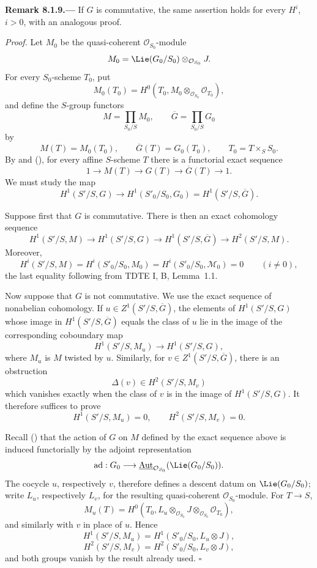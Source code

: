 \par\medskip\noindent{}\textbf{Remark 8.1.9.---}\enspace
If \(G\) is commutative, the same assertion holds for every
\(H^i\), \(i>0\), with an analogous proof.

\smallskip\noindent\emph{Proof.}
Let \(M_0\) be the quasi-coherent \(\mathcal O_{S_0}\)-module
\[
  M_0
  =
  \Lie(G_0/S_0)\otimes_{\mathcal O_{S_0}}J.
\]
For every \(S_0\)-scheme \(T_0\), put
\[
  M_0(T_0)
  =
  H^0\!\left(
    T_0,
    M_0\otimes_{\mathcal O_{S_0}}\mathcal O_{T_0}
  \right),
\]
and define the \(S\)-group functors
\[
  M=\prod_{S_0/S}M_0,
  \qquad
  \overline G=\prod_{S_0/S}G_0
\]
by
\[
  M(T)=M_0(T_0),
  \qquad
  \overline G(T)=G_0(T_0),
  \qquad
  T_0=T\times_SS_0.
\]
By  and (), for every affine \(S\)-scheme \(T\)
there is a functorial exact sequence
\[
  1\longrightarrow M(T)\longrightarrow G(T)
  \longrightarrow\overline G(T)\longrightarrow1.
\]
We must study the map
\[
  H^1(S'/S,G)
  \longrightarrow
  H^1(S'_0/S_0,G_0)
  =
  H^1(S'/S,\overline G).
\]

Suppose first that \(G\) is commutative. There is then an exact
cohomology sequence
\[
  H^1(S'/S,M)
  \longrightarrow H^1(S'/S,G)
  \longrightarrow H^1(S'/S,\overline G)
  \longrightarrow H^2(S'/S,M).
\]
Moreover,
\[
  H^i(S'/S,M)
  =
  H^i(S'_0/S_0,M_0)
  =
  H^i(S'_0/S_0,\mathcal M_0)
  =
  0
  \qquad(i\neq0),
\]
the last equality following from TDTE I, B, Lemma~1.1.

Now suppose that \(G\) is not commutative. We use the exact sequence
of nonabelian cohomology. If
\(u\in Z^1(S'/S,\overline G)\), the elements of \(H^1(S'/S,G)\) whose
image in \(H^1(S'/S,\overline G)\) equals the class of \(u\) lie in the
image of the corresponding coboundary map
\[
  H^1(S'/S,M_u)\longrightarrow H^1(S'/S,G),
\]
where \(M_u\) is \(M\) twisted by \(u\). Similarly, for
\(v\in Z^1(S'/S,\overline G)\), there is an obstruction
\[
  \Delta(v)\in H^2(S'/S,M_v)
\]
which vanishes exactly when the class of \(v\) is in the image of
\(H^1(S'/S,G)\). It therefore suffices to prove
\[
  H^1(S'/S,M_u)=0,
  \qquad
  H^2(S'/S,M_v)=0.
\]

Recall () that the action of \(G\) on \(M\) defined by
the exact sequence above is induced functorially by the adjoint
representation
\[
  \operatorname{ad}:G_0
  \longrightarrow
  \underline{\operatorname{Aut}}_{\mathcal O_{S_0}}
    (\Lie(G_0/S_0)).
\]
The cocycle \(u\), respectively \(v\), therefore defines a descent
datum on \(\Lie(G_0/S_0)\); write \(L_u\), respectively \(L_v\), for
the resulting quasi-coherent \(\mathcal O_{S_0}\)-module. For
\(T\to S\),
\[
  M_u(T)
  =
  H^0\!\left(
    T_0,
    L_u\otimes_{\mathcal O_{S_0}}J
      \otimes_{\mathcal O_{S_0}}\mathcal O_{T_0}
  \right),
\]
and similarly with \(v\) in place of \(u\). Hence
\[
  H^1(S'/S,M_u)=H^1(S'_0/S_0,L_u\otimes J),
\]
\[
  H^2(S'/S,M_v)=H^2(S'_0/S_0,L_v\otimes J),
\]
and both groups vanish by the result already used.
\hfill\(\square\)

